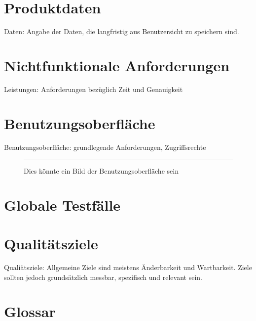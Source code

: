\documentclass[a4paper]{scrreprt}
\begin{document}
    \chapter{Produktdaten}
        Daten: Angabe der Daten, die langfristig aus Benutzersicht zu speichern sind.
 
    \chapter{Nichtfunktionale Anforderungen}
        Leistungen: Anforderungen bezüglich Zeit und Genauigkeit
 
    \chapter{Benutzungsoberfläche}
        Benutzungsoberfläche: grundlegende Anforderungen, Zugriffsrechte
 
        \begin{figure}[ht]
            \centering
            \rule{8cm}{6cm}
            \caption{Dies könnte ein Bild der Benutzungsoberfläche sein}
        \end{figure}

    \chapter{Globale Testfälle}
 
    \chapter{Qualitätsziele}
        Qualiätsziele: Allgemeine Ziele sind meistens Änderbarkeit und Wartbarkeit.
        Ziele sollten jedoch grundsätzlich messbar, spezifisch und relevant sein.
 
    \chapter{Glossar}
 
    \listoffigures
 
\end{document}
